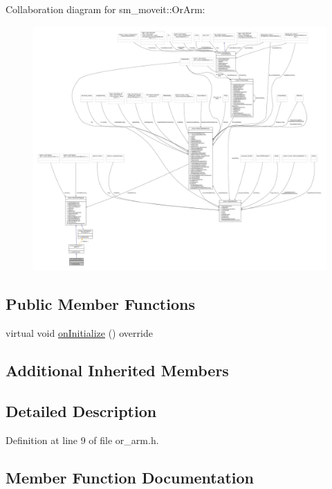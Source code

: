 Collaboration diagram for sm\+\_\+moveit\+:\+:Or\+Arm\+:
\nopagebreak
\begin{figure}[H]
\begin{center}
\leavevmode
\includegraphics[width=350pt]{classsm__moveit_1_1OrArm__coll__graph}
\end{center}
\end{figure}
\subsection*{Public Member Functions}
\begin{DoxyCompactItemize}
\item 
virtual void \hyperlink{classsm__moveit_1_1OrArm_a995fc310fe7cacbf78f45d98d1d96627}{on\+Initialize} () override
\end{DoxyCompactItemize}
\subsection*{Additional Inherited Members}


\subsection{Detailed Description}


Definition at line 9 of file or\+\_\+arm.\+h.



\subsection{Member Function Documentation}
\mbox{\label{classsm__moveit_1_1OrArm_a995fc310fe7cacbf78f45d98d1d96627}} 
